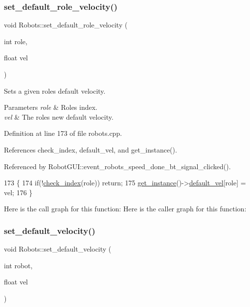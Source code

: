 \subsubsection{\texorpdfstring{set\+\_\+default\+\_\+role\+\_\+velocity()}{set\_default\_role\_velocity()}}
{\footnotesize\ttfamily void Robots\+::set\+\_\+default\+\_\+role\+\_\+velocity (\begin{DoxyParamCaption}\item[{int}]{role,  }\item[{float}]{vel }\end{DoxyParamCaption})\hspace{0.3cm}{\ttfamily [static]}}

Sets a given role\textquotesingle{}s default velocity. 
\begin{DoxyParams}{Parameters}
{\em role} & Role\textquotesingle{}s index. \\
\hline
{\em vel} & The role\textquotesingle{}s new default velocity. \\
\hline
\end{DoxyParams}


Definition at line 173 of file robots.\+cpp.



References check\+\_\+index, default\+\_\+vel, and get\+\_\+instance().



Referenced by Robot\+G\+U\+I\+::event\+\_\+robots\+\_\+speed\+\_\+done\+\_\+bt\+\_\+signal\+\_\+clicked().


\begin{DoxyCode}
173                                                           \{
174     \textcolor{keywordflow}{if}(!\hyperlink{robots_8hpp_ae3e6ae8f87cdc750c0b99bc609d9ae43}{check\_index}(role)) \textcolor{keywordflow}{return};
175     \hyperlink{class_robots_a589bce74db5f34af384952d48435168f}{get\_instance}()->\hyperlink{class_robots_a6c03d49137645a67d5c5e39bb953a788}{default\_vel}[role] = vel;
176 \}
\end{DoxyCode}
Here is the call graph for this function\+:
Here is the caller graph for this function\+:
\mbox{\label{class_robots_a54b514022589049ad5ae94ac11a453cd}} 
\subsubsection{\texorpdfstring{set\+\_\+default\+\_\+velocity()}{set\_default\_velocity()}}
{\footnotesize\ttfamily void Robots\+::set\+\_\+default\+\_\+velocity (\begin{DoxyParamCaption}\item[{int}]{robot,  }\item[{float}]{vel }\end{DoxyParamCaption})\hspace{0.3cm}{\ttfamily [static]}}

